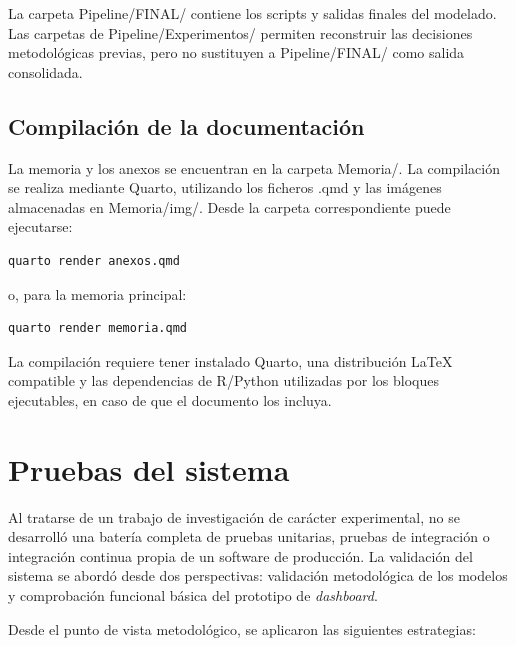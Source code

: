\documentclass[
  spanish,
  a4paper,
  12pt,
  twoside]{memoir}
\newcommand{\ruta}[1]{{\sffamily #1}}
\begin{document}
La carpeta \ruta{Pipeline/FINAL/} contiene los scripts y salidas finales del modelado. Las carpetas de \ruta{Pipeline/Experimentos/} permiten reconstruir las decisiones metodológicas previas, pero no sustituyen a \ruta{Pipeline/FINAL/} como salida consolidada.

\subsection*{Compilación de la documentación}

La memoria y los anexos se encuentran en la carpeta \ruta{Memoria/}. La compilación se realiza mediante Quarto, utilizando los ficheros \ruta{.qmd} y las imágenes almacenadas en \ruta{Memoria/img/}. Desde la carpeta correspondiente puede ejecutarse:

\begin{verbatim}
quarto render anexos.qmd
\end{verbatim}

o, para la memoria principal:

\begin{verbatim}
quarto render memoria.qmd
\end{verbatim}

La compilación requiere tener instalado Quarto, una distribución LaTeX compatible y las dependencias de R/Python utilizadas por los bloques ejecutables, en caso de que el documento los incluya.

\section{Pruebas del sistema}

Al tratarse de un trabajo de investigación de carácter experimental, no se desarrolló una batería completa de pruebas unitarias, pruebas de integración o integración 
continua propia de un software de producción. La validación del sistema se abordó desde dos perspectivas: validación metodológica de los modelos y comprobación funcional 
básica del prototipo de \textit{dashboard}.

Desde el punto de vista metodológico, se aplicaron las siguientes estrategias:
\end{document}
